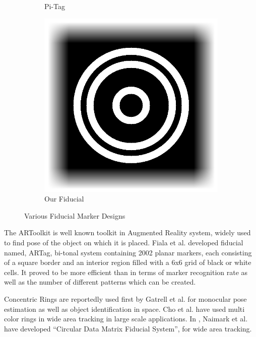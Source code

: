 \documentclass[runningheads]{llncs}
\begin{document}
\begin{figure}
\begin{subfigure}[b]{0.19\textwidth}
  Pi-Tag\cite{Pitag13}  
 \end{subfigure}
 \begin{subfigure}[b]{0.19\textwidth}
  \centering
  \includegraphics[width=\linewidth]{our_fiducial}  
  Our Fiducial  
 \end{subfigure}
 \caption{Various Fiducial Marker Designs}
 \label{fig:previous_work}  
\end{figure}
 
The ARToolkit \cite{ARToolkit02} \cite{kato-artoolkit} is well known toolkit in
Augmented Reality system, widely used to find pose of the object on which it is
placed.  Fiala et al. \cite{Fiala05} developed fiducial named, ARTag, bi-tonal
system containing 2002 planar markers, each consisting of a square border and
an interior region filled with a 6x6 grid of black or white cells. It proved to
be more efficient than \cite{ARToolkit02} in terms of marker recognition rate
as well as the number of different patterns which can be created.  

Concentric Rings are reportedly used first by Gatrell et al.\cite{concentric}
for monocular pose estimation as well as object identification in space. Cho et al.
\cite{Cho:2001}\cite{Cho97fastcolor} have used multi color rings in wide area
tracking in large scale applications. In \cite{NaimarkF02}, Naimark et al.
have developed ``Circular Data Matrix Fiducial System'', for wide area tracking.
\end{document}
